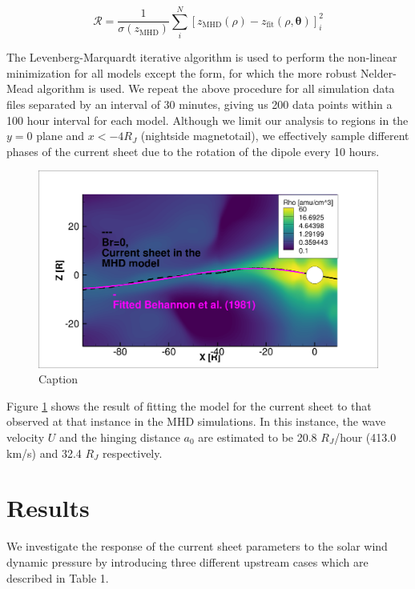 \begin{equation}
    \mathcal{R} = \frac{1}{\sigma(z_\text{MHD})} \sum_i^N \left[ z_\text{MHD}(\rho) - z_\text{fit} (\rho, \boldsymbol\theta) \right]_i^2
\end{equation}

The Levenberg-Marquardt iterative algorithm is used to perform the non-linear minimization for all models except the \cite{Kivelson1978ASheet} form, for which the more robust Nelder-Mead algorithm is used. We repeat the above procedure for all simulation data files separated by an interval of 30 minutes, giving us 200 data points within a 100 hour interval for each model. Although we limit our analysis to regions in the $y=0$ plane and $x < -4 R_J$ (nightside magnetotail), we effectively sample different phases of the current sheet due to the rotation of the dipole every 10 hours.

\begin{figure}
    \centering
    \includegraphics[width=\textwidth]{images6/CurrentSheet_fitted.png}
    \caption{Caption}
    \label{fig:example-fitcurrentsheet}
\end{figure}

Figure \ref{fig:example-fitcurrentsheet} shows the result of fitting the  model for the current sheet to that observed at that instance in the MHD simulations. In this instance, the wave velocity $U$ and the hinging distance $a_0$ are estimated to be 20.8 $R_J$/hour (413.0 km/s) and 32.4 $R_J$ respectively. 

\section{Results}

We investigate the response of the current sheet parameters to the solar wind dynamic pressure by introducing three different upstream cases which are described in Table 1. 

